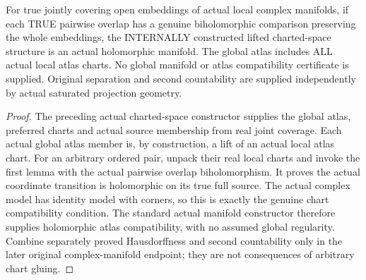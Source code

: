 \begin{theorem}
\label{hir:terminal-atlas-actual-lifted-holomorphic-manifold}
\leanok
{}
For true jointly covering open embeddings of actual local complex manifolds,
if each TRUE pairwise overlap has a genuine biholomorphic comparison
preserving the whole embeddings, the INTERNALLY constructed lifted
charted-space structure is an actual holomorphic manifold. The global
atlas includes ALL actual local atlas charts. No global manifold or atlas
compatibility certificate is supplied. Original separation and second
countability are supplied independently by actual saturated projection geometry.
\end{theorem}
\begin{proof}
The preceding actual charted-space constructor supplies the global atlas,
preferred charts and actual source membership from real joint coverage.
Each actual global atlas member is, by construction, a lift of an actual
local atlas chart. For an arbitrary ordered pair, unpack their real local
charts and invoke the first lemma with the actual pairwise overlap
biholomorphism. It proves the actual coordinate transition is holomorphic
on its true full source. The actual complex model has identity model with
corners, so this is exactly the genuine chart compatibility condition.
The standard actual manifold constructor therefore supplies holomorphic
atlas compatibility, with no assumed global regularity. Combine separately
proved Hausdorffness and second countability only in the later original
complex-manifold endpoint; they are not consequences of arbitrary chart gluing.
\end{proof}

